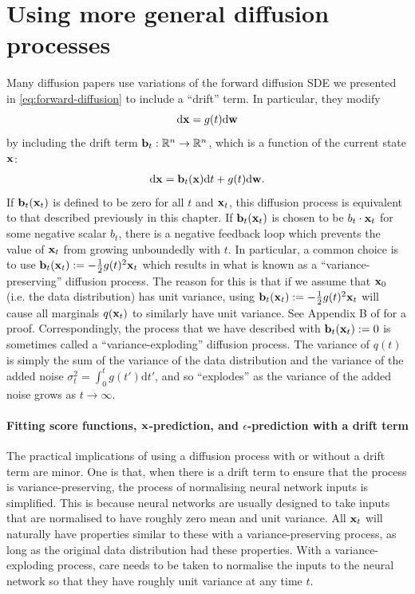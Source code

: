 \section{Using more general diffusion processes}
Many diffusion papers use variations of the forward diffusion SDE we presented in \cref{eq:forward-diffusion} to include a ``drift'' term. In particular, they modify
\begin{equation}
    \mathrm{d}{\mathbf{x}} = g(t) \mathrm{d}{\mathbf{w}}
\end{equation}
by including the drift term ${\mathbf{b}}_t: \mathbb{R}^n \rightarrow \mathbb{R}^n$, which is a function of the current state ${\mathbf{x}}$:
\begin{align} \label{eq:forward-diffusion-with-drift}
    \mathrm{d}{\mathbf{x}} = {\mathbf{b}}_t({\mathbf{x}}) \mathrm{d}t + g(t) \mathrm{d}{\mathbf{w}}.
\end{align}
If ${\mathbf{b}}_t({\mathbf{x}}_t)$ is defined to be zero for all $t$ and ${\mathbf{x}}_t$, this diffusion process is equivalent to that described previously in this chapter. If ${\mathbf{b}}_t({\mathbf{x}}_t)$ is chosen to be $b_t \cdot {\mathbf{x}}_t$ for some negative scalar $b_t$, there is a negative feedback loop which prevents the value of ${\mathbf{x}}_t$ from growing unboundedly with $t$. In particular, a common choice is to use ${\mathbf{b}}_t({\mathbf{x}}_t) := - \frac{1}{2}g(t)^2{\mathbf{x}}_t$ which results in what is known as a ``variance-preserving'' diffusion process. The reason for this is that if we assume that ${\mathbf{x}}_0$ (i.e. the data distribution) has unit variance, using ${\mathbf{b}}_t({\mathbf{x}}_t) := - \frac{1}{2}g(t)^2{\mathbf{x}}_t$ will cause all marginals $q({\mathbf{x}}_t)$ to similarly have unit variance. See Appendix B of \citet{song2020score} for a proof. Correspondingly, the process that we have described with ${\mathbf{b}}_t({\mathbf{x}}_t) := 0$ is sometimes called a ``variance-exploding'' diffusion process. The variance of $q(t)$ is simply the sum of the variance of the data distribution and the variance of the added noise $\sigma_t^2 = \int_0^t g(t') \mathrm{d}t'$, and so ``explodes'' as the variance of the added noise grows as $t \rightarrow \infty$.

\paragraph{Fitting score functions, ${\mathbf{x}}$-prediction, and $\epsilon$-prediction with a drift term}
The practical implications of using a diffusion process with or without a drift term are minor. One is that, when there is a drift term to ensure that the process is variance-preserving, the process of normalising neural network inputs is simplified. This is because neural networks are usually designed to take inputs that are normalised to have roughly zero mean and unit variance. All ${\mathbf{x}}_t$ will naturally have properties similar to these with a variance-preserving process, as long as the original data distribution had these properties. With a variance-exploding process, care needs to be taken to normalise the inputs to the neural network so that they have roughly unit variance at any time $t$. 

